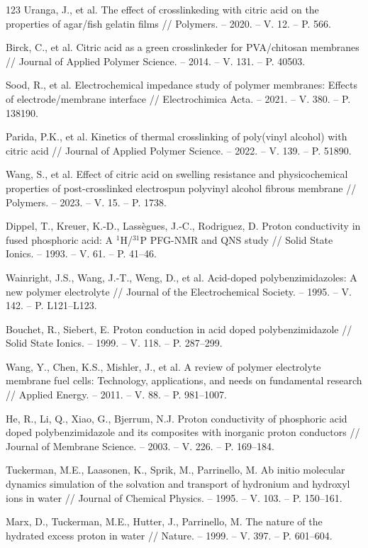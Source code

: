\documentclass[12pt,a4paper]{report}
\begin{document}
\begin{thebibliography}{123}
 Uranga, J., et al. The effect of crosslinkeding with citric acid on the properties of agar/fish gelatin films // Polymers. – 2020. – V. 12. – P. 566.

 Birck, C., et al. Citric acid as a green crosslinkeder for PVA/chitosan membranes // Journal of Applied Polymer Science. – 2014. – V. 131. – P. 40503.

 Sood, R., et al. Electrochemical impedance study of polymer membranes: Effects of electrode/membrane interface // Electrochimica Acta. – 2021. – V. 380. – P. 138190.

 Parida, P.K., et al. Kinetics of thermal crosslinking of poly(vinyl alcohol) with citric acid // Journal of Applied Polymer Science. – 2022. – V. 139. – P. 51890.

 Wang, S., et al. Effect of citric acid on swelling resistance and physicochemical properties of post-crosslinked electrospun polyvinyl alcohol fibrous membrane // Polymers. – 2023. – V. 15. – P. 1738.

 Dippel, T., Kreuer, K.-D., Lassègues, J.-C., Rodriguez, D. Proton conductivity in fused phosphoric acid: A \(^1\)H/\(^{31}\)P PFG-NMR and QNS study // Solid State Ionics. – 1993. – V. 61. – P. 41–46.

 Wainright, J.S., Wang, J.-T., Weng, D., et al. Acid-doped polybenzimidazoles: A new polymer electrolyte // Journal of the Electrochemical Society. – 1995. – V. 142. – P. L121–L123.

 Bouchet, R., Siebert, E. Proton conduction in acid doped polybenzimidazole // Solid State Ionics. – 1999. – V. 118. – P. 287–299.

 Wang, Y., Chen, K.S., Mishler, J., et al. A review of polymer electrolyte membrane fuel cells: Technology, applications, and needs on fundamental research // Applied Energy. – 2011. – V. 88. – P. 981–1007.

 He, R., Li, Q., Xiao, G., Bjerrum, N.J. Proton conductivity of phosphoric acid doped polybenzimidazole and its composites with inorganic proton conductors // Journal of Membrane Science. – 2003. – V. 226. – P. 169–184.

 Tuckerman, M.E., Laasonen, K., Sprik, M., Parrinello, M. Ab initio molecular dynamics simulation of the solvation and transport of hydronium and hydroxyl ions in water // Journal of Chemical Physics. – 1995. – V. 103. – P. 150–161.

 Marx, D., Tuckerman, M.E., Hutter, J., Parrinello, M. The nature of the hydrated excess proton in water // Nature. – 1999. – V. 397. – P. 601–604.


\end{thebibliography}
\end{document}
